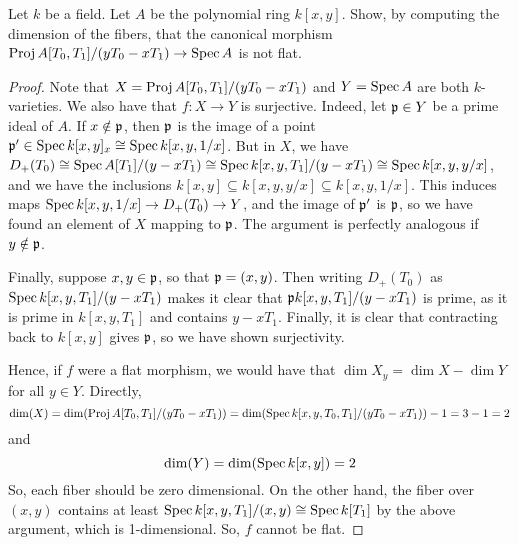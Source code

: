 \begin{exercise}[4.3.4] Let $k$ be a field. Let $A$ be the polynomial ring $k[x,y]$. Show, by computing the dimension of the fibers, that the canonical morphism $\operatorname{Proj} A[T_0,T_1]/(yT_0 - xT_1) \to \operatorname{Spec} A$ is not flat. \end{exercise}
\begin{proof}
	Note that $X = \operatorname{Proj} A[T_0,T_1]/(yT_0-xT_1)$ and $Y = \operatorname{Spec} A$ are both $k$-varieties. We also have that $f : X \to Y$ is surjective. Indeed, let $\mathfrak{p} \in Y$ be a prime ideal of $A$. If $x \notin \mathfrak{p}$, then $\mathfrak{p}$ is the image of a point $\mathfrak{p}' \in \operatorname{Spec} k[x,y]_{x} \cong \operatorname{Spec} k[x,y,1/x]$. But in $X$, we have $D_{+}(T_0) \cong \operatorname{Spec} A[T_1]/(y-xT_1) \cong \operatorname{Spec} k[x,y,T_1]/(y-xT_1) \cong \operatorname{Spec} k[x,y,y/x]$, and we have the inclusions $k[x,y] \subseteq k[x,y,y/x] \subseteq k[x,y,1/x]$. This induces maps $\operatorname{Spec} k[x,y,1/x] \to D_{+}(T_0) \to Y$, and the image of $\mathfrak{p}'$ is $\mathfrak{p}$, so we have found an element of $X$ mapping to $\mathfrak{p}$. The argument is perfectly analogous if $y \notin \mathfrak{p}$.
	
	Finally, suppose $x,y \in \mathfrak{p}$, so that $\mathfrak{p} = (x,y)$. Then writing $D_{+}(T_0)$ as $\operatorname{Spec} k[x,y,T_1]/(y-xT_1)$ makes it clear that $\mathfrak{p} k[x,y,T_1]/(y-xT_1)$ is prime, as it is prime in $k[x,y,T_1]$ and contains $y-xT_1$. Finally, it is clear that contracting back to $k[x,y]$ gives $\mathfrak{p}$, so we have shown surjectivity.
	
	Hence, if $f$ were a flat morphism, we would have that $\dim X_y = \dim X - \dim Y$ for all $y \in Y$. Directly,
	\[ \dim(X) = \dim(\operatorname{Proj} A[T_0,T_1]/(yT_0-xT_1)) = \dim(\operatorname{Spec} k[x,y,T_0,T_1]/(yT_0-xT_1))-1 = 3-1 = 2 \]
	and
	\[ \dim(Y) = \dim(\operatorname{Spec} k[x,y]) = 2 \]
	So, each fiber should be zero dimensional. On the other hand, the fiber over $(x,y)$ contains at least $\operatorname{Spec} k[x,y,T_1]/(x,y) \cong \operatorname{Spec} k[T_1]$ by the above argument, which is 1-dimensional. So, $f$ cannot be flat.
\end{proof}
